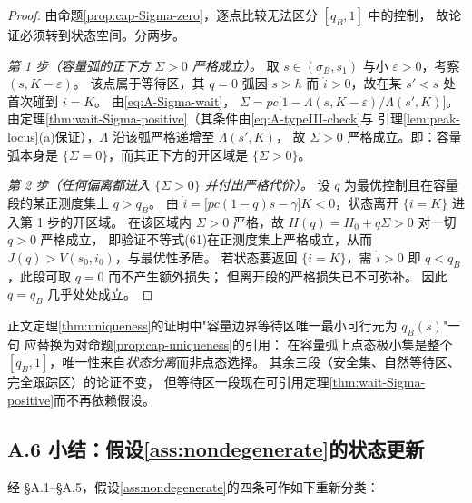 \begin{proof}
由命题\ref{prop:cap-Sigma-zero}，逐点比较无法区分 $[q_B,1]$ 中的控制，
故论证必须转到状态空间。分两步。

\emph{第 1 步（容量弧的正下方 $\Sigma>0$ 严格成立）。}
取 $s\in(\sigma_B,s_1)$ 与小 $\varepsilon>0$，考察 $(s,K-\varepsilon)$。
该点属于等待区，其 $q=0$ 弧因 $s>h$ 而 $\dot i>0$，故在某 $s'<s$ 处首次碰到 $i=K$。
由\eqref{eq:A-Sigma-wait}，
$\Sigma=pc\bigl[1-\Lambda(s,K-\varepsilon)/\Lambda(s',K)\bigr]$。
由定理\ref{thm:wait-Sigma-positive}（其条件由\eqref{eq:A-typeIII-check}与
引理\ref{lem:peak-locus}(a)保证），$\Lambda$ 沿该弧严格递增至 $\Lambda(s',K)$，
故 $\Sigma>0$ 严格成立。即：容量弧本身是 $\{\Sigma=0\}$，而其正下方的开区域是 $\{\Sigma>0\}$。

\emph{第 2 步（任何偏离都进入 $\{\Sigma>0\}$ 并付出严格代价）。}
设 $q$ 为最优控制且在容量段的某正测度集上 $q>q_B$。
由 $\dot i=\bigl[pc(1-q)s-\gamma\bigr]K<0$，状态离开 $\{i=K\}$ 进入第 1 步的开区域。
在该区域内 $\Sigma>0$ 严格，故 $H(q)=H_0+q\Sigma>0$ 对一切 $q>0$ 严格成立，
即验证不等式(61)在正测度集上严格成立，从而
$J(q)>V(s_0,i_0)$，与最优性矛盾。
若状态要返回 $\{i=K\}$，需 $\dot i>0$ 即 $q<q_B$，此段可取 $q=0$ 而不产生额外损失；
但离开段的严格损失已不可弥补。
因此 $q=q_B$ 几乎处处成立。
\end{proof}

\begin{remark}
正文定理\ref{thm:uniqueness}的证明中"容量边界等待区唯一最小可行元为 $q_B(s)$"一句
应替换为对命题\ref{prop:cap-uniqueness}的引用：
在容量弧上点态极小集是整个 $[q_B,1]$，唯一性来自\emph{状态分离}而非点态选择。
其余三段（安全集、自然等待区、完全跟踪区）的论证不变，
但等待区一段现在可引用定理\ref{thm:wait-Sigma-positive}而不再依赖假设。
\end{remark}


\subsection*{A.6 小结：假设\ref{ass:nondegenerate}的状态更新}

经 \S A.1--\S A.5，假设\ref{ass:nondegenerate}的四条可作如下重新分类：

